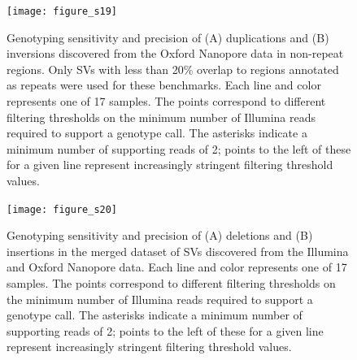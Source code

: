 \documentclass[12pt]{article}
\newenvironment{cfigure}
	{\begin{figure} \centering}
	{\end{figure}}
\newenvironment{lsfigure}
	{\begin{landscape} \begin{figure} \centering}
	{\end{figure} \end{landscape}}
\begin{document}
\begin{cfigure}
	\texttt{[image: figure\_s19]}

	\caption[Sensitivity and precision of Oxford Nanopore duplication and inversion genotyping in non-repeat regions]{
		Genotyping sensitivity and precision of (A) duplications and (B) inversions discovered from the Oxford Nanopore data in non-repeat regions.
		Only SVs with less than 20\% overlap to regions annotated as repeats were used for these benchmarks. 
		Each line and color represents one of 17 samples. 
		The points correspond to different filtering thresholds on the minimum number of Illumina reads required to support a genotype call.
		The asterisks indicate a minimum number of supporting reads of 2; points to the left of these for a given line represent increasingly stringent filtering threshold values.
	}

	\label{fig_s19}

\end{cfigure}

\clearpage%

\begin{lsfigure}
	\texttt{[image: figure\_s20]}

	\caption[Sensitivity and precision of joint Illumina/Oxford Nanopore deletion and insertion genotyping]{
		Genotyping sensitivity and precision of (A) deletions and (B) insertions in the merged dataset of SVs discovered from the Illumina and Oxford Nanopore data.
			Each line and color represents one of 17 samples. 
			The points correspond to different filtering thresholds on the minimum number of Illumina reads required to support a genotype call.
			The asterisks indicate a minimum number of supporting reads of 2; points to the left of these for a given line represent increasingly stringent filtering threshold values.
	}

	\label{fig_s20}
\end{lsfigure}

\clearpage%
\end{document}
